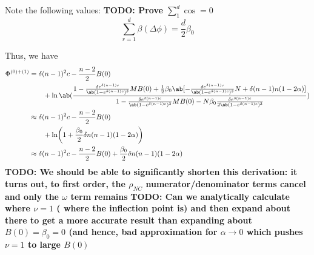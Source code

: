 Note the following values:
\textbf{TODO: Prove $\sum_1^d \cos = 0$}
\begin{equation}
  \sum_{r=1}^d \beta(\Delta \phi) = \frac{d}{2} \beta_0
\end{equation}

Thus, we have
\begin{equation}
  \begin{aligned}
    \Phi^{(0)+(1)} &=
\delta(n-1)^2 c - \frac{n-2}{2} B(0) \\
  &\qquad +
\ln\ab(
\frac{
1 -
    \frac{\delta e^{\delta(n-1)c}}{\ab(1-e^{\delta (n-1)c})^3}
  M B(0)
+
\frac{1}{2}\beta_0\ab[
-
    \frac{\delta e^{\delta(n-1)c}}{\ab(1-e^{\delta (n-1)c})^3} N
    +
\delta (n-1) n (1 - 2 \alpha)
]
}
{1 -
    \frac{\delta e^{\delta(n-1)c}}{\ab(1-e^{\delta (n-1)c})^3}
  M B(0)
  - N \beta_0 \frac{\delta e^{\delta(n-1)c}}{2\ab(1-e^{\delta (n-1)c})^3}
                  }
  )
  \\
  &\approx
\delta(n-1)^2 c - \frac{n-2}{2} B(0) \\
  &\qquad +
\ln \biggl(
  1 + \frac{\beta_0}{2} \delta n (n-1) (1-2\alpha)
\biggr)
  \\
  &\approx
  \delta(n-1)^2 c - \frac{n-2}{2} B(0) +
  \frac{\beta_0}{2} \delta n (n-1) (1-2\alpha)
\end{aligned}
\label{eq:analytic_first_term}
\end{equation}
\textbf{TODO: We should be able to significantly shorten this
  derivation: it turns out, to first order, the $\rho_{NC}$
  numerator/denominator terms cancel and only the $\omega$ term remains}
\textbf{TODO: Can we analytically calculate where $\nu = 1$ (\ie{} where
  the inflection point is) and then expand about there to get a more
  accurate result than expanding about $B(0) = \beta_0 = 0$ (and hence,
  bad approximation for $\alpha \to 0$ which pushes $\nu=1$ to large
  $B(0)$}
